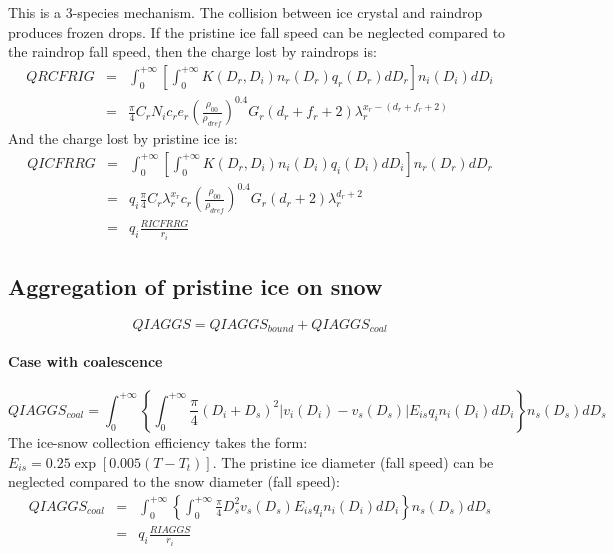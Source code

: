 This is a 3-species mechanism.
The collision between ice crystal and raindrop produces frozen drops.
If the pristine ice fall speed can be neglected compared to the raindrop fall speed, then the charge lost by raindrops is:
\begin{eqnarray}
  QRCFRIG &=& \int_0 ^{+ \infty} \left[ \int_0 ^{+ \infty}
    K(D_r , D_i) n_r (D_r) q_r (D_r) dD_r \right] n_i (D_i) dD_i \nonumber \\
          &=& \frac{\pi}{4} C_r N_i c_r e_r
              \left( \frac{\rho _{00}}{\rho _{dref}} \right) ^{0.4}
              G_r (d_r + f_r + 2) \lambda _r ^{x_r - (d_r + f_r + 2)}
\end{eqnarray}
And the charge lost by pristine ice is:
\begin{eqnarray}
  QICFRRG &=& \int_0 ^{+ \infty} \left[ \int_0 ^{+ \infty}
    K(D_r , D_i) n_i (D_i) q_i (D_i) dD_i \right] n_r (D_r) dD_r \nonumber \\
          &=& q_i \frac{\pi}{4} C_r \lambda _r ^{x_r} c_r
              \left( \frac{\rho _{00}}{\rho _{dref}} \right) ^{0.4}
              G_r (d_r + 2) \lambda _r ^{d_r + 2} \nonumber \\
          &=& q_i \frac{RICFRRG}{r_i}
\end{eqnarray}

\subsection{Aggregation of pristine ice on snow}

\begin{equation}
  QIAGGS = QIAGGS_{bound} + QIAGGS_{coal}
\end{equation}


\paragraph{Case with coalescence}

\begin{equation}
  QIAGGS_{coal} = \int_0 ^{+ \infty} \left\{\int_0 ^{+ \infty} \frac{\pi}{4} (D_i + D_s)^2 |v_i (D_i) - v_s (D_s)| E_{is} q_i n_i (D_i) dD_i \right\} n_s (D_s) dD_s \nonumber
\end{equation}
The ice-snow collection efficiency takes the form: $E_{is} = 0.25 \exp[0.005(T - T_t)]$.
The pristine ice diameter (fall speed) can be neglected compared to the snow diameter (fall speed):
\begin{eqnarray}
  QIAGGS_{coal} &=& \int_0 ^{+ \infty} \left\{\int_0 ^{+ \infty} \frac{\pi}{4} D_s^2 v_s (D_s) E_{is} q_i n_i (D_i) dD_i \right\} n_s (D_s) dD_s \nonumber \\
                &=& q_i \frac{RIAGGS}{r_i}
\end{eqnarray}


